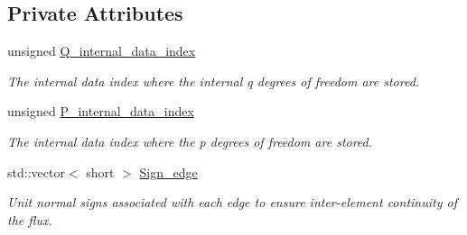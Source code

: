 \subsection*{Private Attributes}
\begin{DoxyCompactItemize}
\item 
unsigned \hyperlink{classoomph_1_1TAxisymmetricPoroelasticityElement_a22ed2100966da5e73fd7d38d58bee36c}{Q\+\_\+internal\+\_\+data\+\_\+index}
\begin{DoxyCompactList}\small\item\em The internal data index where the internal q degrees of freedom are stored. \end{DoxyCompactList}\item 
unsigned \hyperlink{classoomph_1_1TAxisymmetricPoroelasticityElement_a439e9489d185eeae1b1085dde8ae0e7d}{P\+\_\+internal\+\_\+data\+\_\+index}
\begin{DoxyCompactList}\small\item\em The internal data index where the p degrees of freedom are stored. \end{DoxyCompactList}\item 
std\+::vector$<$ short $>$ \hyperlink{classoomph_1_1TAxisymmetricPoroelasticityElement_a19992fa82fa97f7f16aad3209d8bd8a0}{Sign\+\_\+edge}
\begin{DoxyCompactList}\small\item\em Unit normal signs associated with each edge to ensure inter-\/element continuity of the flux. \end{DoxyCompactList}\end{DoxyCompactItemize}
